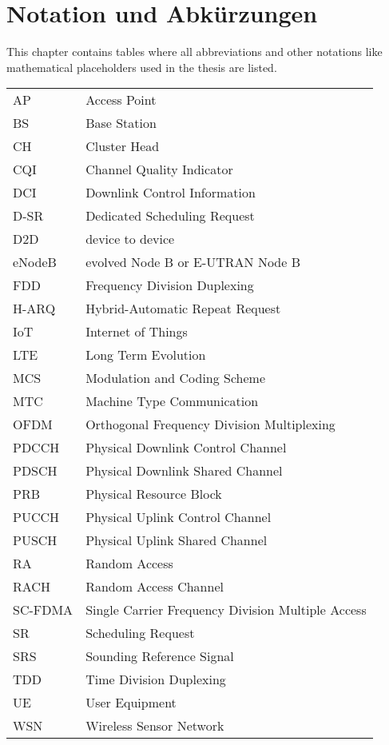 \chapter{Notation und Abkürzungen}
This chapter contains tables where all abbreviations and other notations like mathematical
placeholders used in the thesis are listed.
\begin{table}[h]
\begin{tabular}{ll}
AP & Access Point\\
BS & Base Station\\
CH & Cluster Head\\
CQI & Channel Quality Indicator\\
DCI & Downlink Control Information\\
D-SR & Dedicated Scheduling Request\\
D2D & device to device\\
eNodeB & evolved Node B or E-UTRAN Node B\\
FDD & Frequency Division Duplexing\\
H-ARQ & Hybrid-Automatic Repeat Request\\
IoT & Internet of Things\\
LTE & Long Term Evolution\\
MCS & Modulation and Coding Scheme\\
MTC & Machine Type Communication\\
OFDM & Orthogonal Frequency Division Multiplexing\\
PDCCH & Physical Downlink Control Channel\\
PDSCH & Physical Downlink Shared Channel\\
PRB & Physical Resource Block\\
PUCCH & Physical Uplink Control Channel\\
PUSCH & Physical Uplink Shared Channel\\
RA & Random Access\\
RACH & Random Access Channel\\
SC-FDMA & Single Carrier Frequency Division Multiple Access\\
SR & Scheduling Request\\
SRS & Sounding Reference Signal\\
TDD & Time Division Duplexing\\
UE & User Equipment\\
WSN & Wireless Sensor Network\\
\end{tabular}
\end{table}

